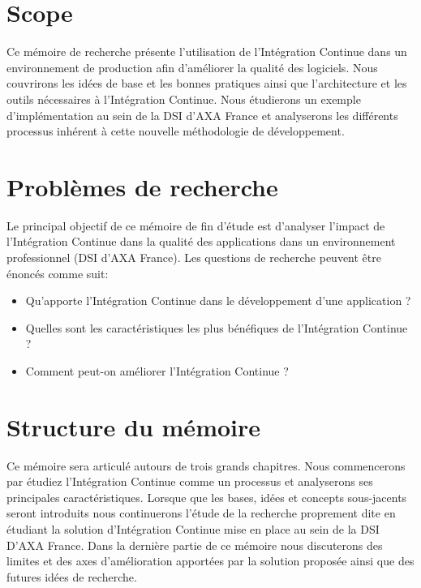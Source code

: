 \documentclass{report}
\begin{document}
    \section{Scope}
    Ce mémoire de recherche présente l'utilisation de l'Intégration Continue dans un environnement de production afin d'améliorer la qualité des logiciels. Nous couvrirons les idées de base et les bonnes pratiques ainsi que l'architecture et les outils nécessaires à l'Intégration Continue. Nous étudierons un exemple d'implémentation au sein de la DSI d'AXA France et analyserons les différents processus inhérent à cette nouvelle méthodologie de développement.

    \section{Problèmes de recherche}
    Le principal objectif de ce mémoire de fin d'étude est d'analyser l'impact de l'Intégration Continue dans la qualité des applications dans un environnement professionnel (DSI d'AXA France). Les questions de recherche peuvent être énoncés comme suit:\\
    \begin{itemize}
      \item Qu'apporte l'Intégration Continue dans le développement d'une application ?
      \item Quelles sont les caractéristiques les plus bénéfiques de l'Intégration Continue ?
      \item Comment peut-on améliorer l'Intégration Continue ?\\
    \end{itemize}

    \section{Structure du mémoire}
    Ce mémoire sera articulé autours de trois grands chapitres. Nous commencerons par étudiez l'Intégration Continue comme un processus et analyserons ses principales caractéristiques. Lorsque que les bases, idées et concepts sous-jacents seront introduits nous continuerons l'étude de la recherche proprement dite en étudiant la solution d'Intégration Continue mise en place au sein de la DSI D'AXA France. Dans la dernière partie de ce mémoire nous discuterons des limites et des axes d'amélioration apportées par la solution proposée ainsi que des futures idées de recherche.


  

  

  

  \listoffigures                  %
  \appendix
  \label{CloudComputing}
\end{document}
